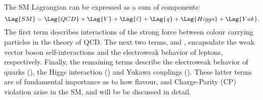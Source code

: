 The SM Lagrangian can be expressed as a sum of components:
\begin{equation}
  \Lag{SM} = \Lag{QCD} + \Lag{V} + \Lag{\ell} + \Lag{\it q} + \Lag{Higgs} + \Lag{Yuk}.
  \label{eq:th:lag}
\end{equation}
The first term describes interactions of the strong force between colour carrying particles in the
theory of QCD.
The next two terms,  and \Lag{\ell}, encapsulate the weak vector boson self-interactions
and the electroweak behavior of leptons, respectively.
Finally, the remaining terms describe the electroweak behavior of quarks (), the Higgs
interaction () and
Yukawa couplings ().
These latter terms are of fundamental importance as to how flavour, and Charge-Parity (CP)
violation
arise in the SM, and will be be discussed in detail.

